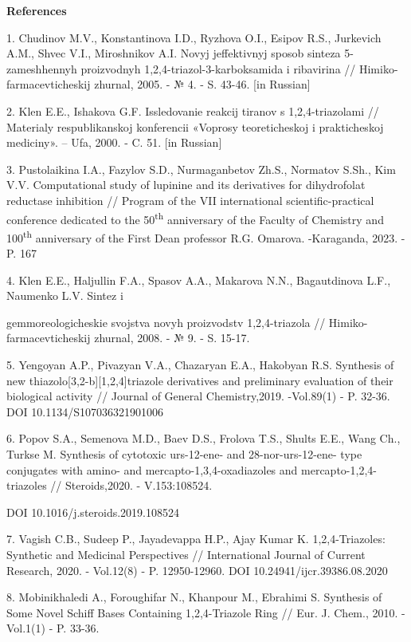 \begin{center}
{\bfseries References}
\end{center}

\begin{noparindent}
1. Chudinov M.V., Konstantinova I.D., Ryzhova O.I., Esipov R.S.,
Jurkevich A.M., Shvec V.I., Miroshnikov A.I. Novyj jeffektivnyj sposob
sinteza 5-zameshhennyh proizvodnyh 1,2,4-triazol-3-karboksamida i
ribavirina // Himiko-farmacevticheskij zhurnal, 2005. - № 4. - S. 43-46.
{[}in Russian{]}

2. Klen E.E., Ishakova G.F. Issledovanie reakcij tiranov s
1,2,4-triazolami // Materialy respublikanskoj konferencii «Voprosy
teoreticheskoj i prakticheskoj mediciny». -- Ufa, 2000. - C. 51. {[}in
Russian{]}

3. Pustolaikina I.A., Fazylov S.D., Nurmaganbetov Zh.S., Normatov S.Sh.,
Kim V.V. Computational study of lupinine and its derivatives for
dihydrofolat reductase inhibition // Program of the VII international
scientific-practical conference dedicated to the 50\textsuperscript{th}
anniversary of the Faculty of Chemistry and 100\textsuperscript{th}
anniversary of the First Dean professor R.G. Omarova. -Karaganda, 2023.
- P. 167

4. Klen E.E., Haljullin F.A., Spasov A.A., Makarova N.N., Bagautdinova
L.F., Naumenko L.V. Sintez i

gemmoreologicheskie svojstva novyh
proizvodstv 1,2,4-triazola // Himiko-farmacevticheskij zhurnal, 2008. -
№ 9. - S. 15-17.

5. Yengoyan A.P., Pivazyan V.A., Chazaryan E.A., Hakobyan R.S. Synthesis
of new thiazolo{[}3,2-b{]}{[}1,2,4{]}triazole derivatives and
preliminary evaluation of their biological activity // Journal of
General Chemistry,2019. -Vol.89(1) - P. 32-36. DOI
10.1134/S107036321901006

6. Popov S.A., Semenova M.D., Baev D.S., Frolova T.S., Shults E.E., Wang
Ch., Turkse M. Synthesis of cytotoxic urs-12-ene- and 28-nor-urs-12-ene-
type conjugates with amino- and mercapto-1,3,4-oxadiazoles and
mercapto-1,2,4-triazoles // Steroids,2020. - V.153:108524.

DOI 10.1016/j.steroids.2019.108524

7. Vagish C.B., Sudeep P., Jayadevappa H.P., Ajay Kumar K.
1,2,4-Triazoles: Synthetic and Medicinal Perspectives // International
Journal of Current Research, 2020. - Vol.12(8) - P. 12950-12960. DOI
10.24941/ijcr.39386.08.2020

8. Mobinikhaledi A., Foroughifar N., Khanpour M., Ebrahimi S. Synthesis
of Some Novel Schiff Bases Containing 1,2,4-Triazole Ring // Eur. J.
Chem., 2010. -Vol.1(1) - P. 33-36.


\end{noparindent}
